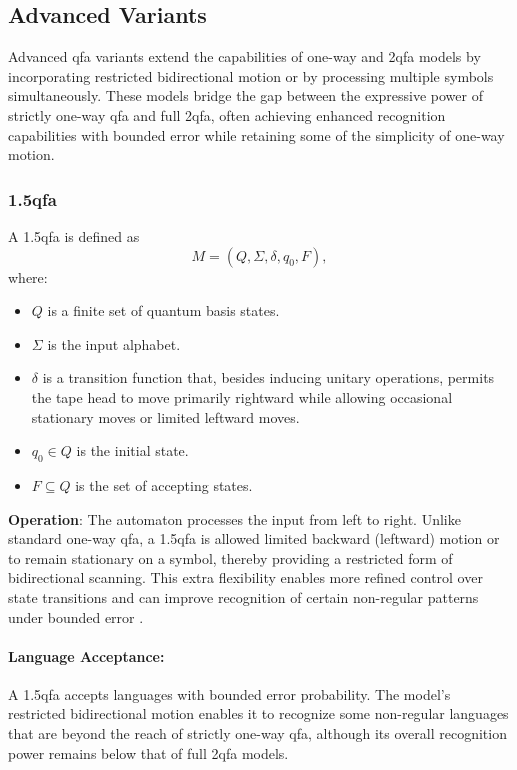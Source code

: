 \subsection{Advanced Variants}
\label{subsec:advanced-variants}

Advanced \gls{qfa} variants extend the capabilities of one-way and \gls{2qfa} models by incorporating restricted bidirectional motion or by processing multiple symbols simultaneously. These models bridge the gap between the expressive power of strictly one-way \gls{qfa} and full \gls{2qfa}, often achieving enhanced recognition capabilities with bounded error while retaining some of the simplicity of one-way motion.

\subsubsection{\gls{1.5qfa}}
\label{sssec:1.5qfa}
\begin{definition}
A \gls{1.5qfa} is defined as 
\[
M = (Q, \Sigma, \delta, q_0, F),
\]
where:
\begin{itemize}
    \item \( Q \) is a finite set of quantum basis states.
    \item \( \Sigma \) is the input alphabet.
    \item \( \delta \) is a transition function that, besides inducing unitary operations, permits the tape head to move primarily rightward while allowing occasional stationary moves or limited leftward moves.
    \item \( q_0 \in Q \) is the initial state.
    \item \( F \subseteq Q \) is the set of accepting states.
\end{itemize}
\end{definition}

\textbf{Operation}:  
The automaton processes the input from left to right. Unlike standard one-way \gls{qfa}, a \gls{1.5qfa} is allowed limited backward (leftward) motion or to remain stationary on a symbol, thereby providing a restricted form of bidirectional scanning. This extra flexibility enables more refined control over state transitions and can improve recognition of certain non-regular patterns under bounded error \cite{kondacs1997power}.

\paragraph{Language Acceptance:}  
A \gls{1.5qfa} accepts languages with bounded error probability. The model’s restricted bidirectional motion enables it to recognize some non-regular languages that are beyond the reach of strictly one-way \gls{qfa}, although its overall recognition power remains below that of full \gls{2qfa} models.

